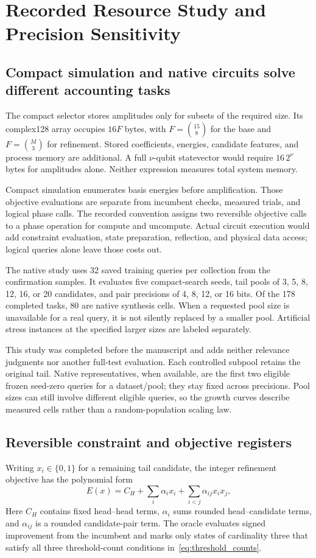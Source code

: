 \section{Recorded Resource Study and Precision Sensitivity}\label{sec:resources}
\subsection{Compact simulation and native circuits solve different accounting tasks}
The compact selector stores amplitudes only for subsets of the required size. Its complex128 array occupies $16F$ bytes, with $F=\binom{15}{8}$ for the base and $F=\binom{M}{3}$ for refinement. Stored coefficients, energies, candidate features, and process memory are additional. A full $\nu$-qubit statevector would require $16\,2^\nu$ bytes for amplitudes alone. Neither expression measures total system memory.

Compact simulation enumerates basis energies before amplification. Those objective evaluations are separate from incumbent checks, measured trials, and logical phase calls. The recorded convention assigns two reversible objective calls to a phase operation for compute and uncompute. Actual circuit execution would add constraint evaluation, state preparation, reflection, and physical data access; logical queries alone leave those costs out.

The native study uses 32 saved training queries per collection from the confirmation samples. It evaluates five compact-search seeds, tail pools of 3, 5, 8, 12, 16, or 20 candidates, and pair precisions of 4, 8, 12, or 16 bits. Of the 178 completed tasks, 80 are native synthesis cells. When a requested pool size is unavailable for a real query, it is not silently replaced by a smaller pool. Artificial stress instances at the specified larger sizes are labeled separately.

This study was completed before the manuscript and adds neither relevance judgments nor another full-test evaluation. Each controlled subpool retains the original tail. Native representatives, when available, are the first two eligible frozen seed-zero queries for a dataset/pool; they stay fixed across precisions. Pool sizes can still involve different eligible queries, so the growth curves describe measured cells rather than a random-population scaling law.

\subsection{Reversible constraint and objective registers}
Writing $x_i\in\{0,1\}$ for a remaining tail candidate, the integer refinement objective has the polynomial form
\begin{equation}
E(x)=C_H+\sum_i\alpha_i x_i+\sum_{i<j}\alpha_{ij}x_ix_j,
\label{eq:native_polynomial}
\end{equation}
Here $C_H$ contains fixed head--head terms, $\alpha_i$ sums rounded head--candidate terms, and $\alpha_{ij}$ is a rounded candidate-pair term. The oracle evaluates signed improvement from the incumbent and marks only states of cardinality three that satisfy all three threshold-count conditions in~\eqref{eq:threshold_counts}.

